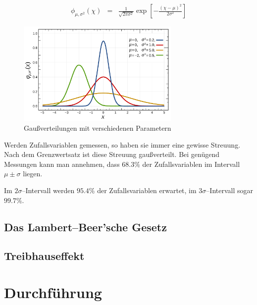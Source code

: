 \documentclass[12pt,a4paper]{scrartcl}
\numberwithin{equation}{section} %
\renewcommand{\[}{} %
\renewcommand{\]}{\noindent} %
\begin{document}
\[
\begin{eqnarray}
    \phi_{\mu,\sigma^2}(\chi) &=&
        \frac{1}{\sqrt{2\pi\sigma^2}}
        \exp\left[
            -
            \frac{(\chi - \mu)^2}{2\sigma^2}
        \right]
\end{eqnarray}
\]

\begin{figure}[h]
	\centering
	\includegraphics[width=0.7\textwidth]{../media/B1.1/Gaussverteilungen.pdf}
	\caption{Gaußverteilungen mit verschiedenen Parametern \cite{abb:gaussians}}
	\label{abb:gaussians}
\end{figure}

\noindent
Werden Zufallsvariablen gemessen, so haben sie immer eine gewisse Streuung. Nach dem Grenzwertsatz ist diese Streuung gaußverteilt. Bei genügend Messungen kann man annehmen, dass \(68.3\%\) der Zufallsvariablen im Intervall \(\mu\pm\sigma\) liegen.

Im \(2\sigma\)--Intervall werden \(95.4\%\) der Zufallsvariablen erwartet, im \(3\sigma\)--Intervall sogar \(99.7\%\).

\hypertarget{das-lambertbeersche-gesetz}{%
\subsection{Das Lambert--Beer'sche
Gesetz}\label{das-lambertbeersche-gesetz}}

\hypertarget{treibhauseffekt}{%
\subsection{Treibhauseffekt}\label{treibhauseffekt}}

\clearpage
\hypertarget{durchfuxfchrung}{%
\section{Durchführung}\label{durchfuxfchrung}}
\end{document}
